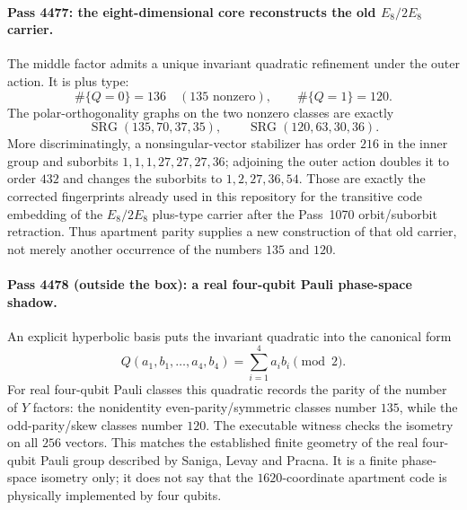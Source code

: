 \paragraph{Pass 4477: the eight-dimensional core reconstructs the old $E_8/2E_8$ carrier.}
The middle factor admits a unique invariant quadratic refinement under the
outer action.  It is plus type:
\[
  \#\{Q=0\}=136\quad(135\text{ nonzero}),
  \qquad \#\{Q=1\}=120.
\]
The polar-orthogonality graphs on the two nonzero classes are exactly
\begin{equation}
 \boxed{\operatorname{SRG}(135,70,37,35),}
 \qquad
 \boxed{\operatorname{SRG}(120,63,30,36).}
 \label{eq:pass4477-e8-srgs}
\end{equation}
More discriminatingly, a nonsingular-vector stabilizer has order $216$ in the
inner group and suborbits
$1,1,1,27,27,27,36$; adjoining the outer action doubles it to order $432$ and
changes the suborbits to $1,2,27,36,54$.  Those are exactly the corrected
fingerprints already used in this repository for the transitive code embedding
of the $E_8/2E_8$ plus-type carrier after the Pass~1070 orbit/suborbit
retraction.  Thus apartment parity supplies a new construction of that old
carrier, not merely another occurrence of the numbers $135$ and $120$.

\paragraph{Pass 4478 (outside the box): a real four-qubit Pauli phase-space shadow.}
An explicit hyperbolic basis puts the invariant quadratic into the canonical
form
\begin{equation}
 \boxed{Q(a_1,b_1,\ldots,a_4,b_4)=\sum_{i=1}^4 a_i b_i\pmod2.}
 \label{eq:pass4478-pauli-q}
\end{equation}
For real four-qubit Pauli classes this quadratic records the parity of the
number of $Y$ factors: the nonidentity even-parity/symmetric classes number
$135$, while the odd-parity/skew classes number $120$.  The executable witness
checks the isometry on all $256$ vectors.  This matches the established finite
geometry of the real four-qubit Pauli group described by Saniga, Levay and
Pracna.  It is a finite phase-space isometry only; it does not say that the
$1620$-coordinate apartment code is physically implemented by four qubits.

